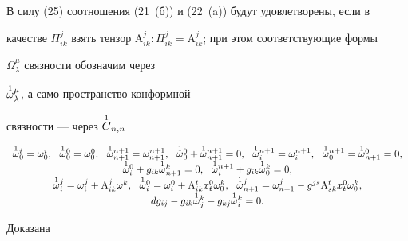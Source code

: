 В силу (25) соотношения (21~(б)) и (22~(a)) будут удовлетворены, если в 


качестве $\Pi^j_{i k}$ взять тензор $\mathrm A^j_{i k}:\Pi^j_{i 


k}=\mathrm A^j_{i k}$; при этом соответствующие формы 


$\Omega^\mu_\lambda$ связности обозначим через 


$\overset{1}{\omega}{}{^\mu_\lambda}$, а само пространство конформной 


связности --- через $\overset{1}{C}{}{}_{n,n}$


\begin{equation} 


\begin{array}{c} 


\up{1}{\omega}{}^i_0=\omega^i_0,\ \ \up{1}{\omega}{}^0_0= 


\omega^0_0,\ \ \up{1}{\omega}{}^{n+1}_{n+1}=\omega^{n+1}_{n+1}, \ \ 


\up{1}{\omega}{}^0_0+\up{1}{\omega}{}^{n+1}_{n+1}=0, \ \ 


\up{1}{\omega}{}^{n+1}_i=\omega^{n+1}_i,\ \ 


\up{1}{\omega}{}^{n+1}_0=\up{1}{\omega}{}^0_{n+1}=0, \\ 


% 


\up{1}{\omega}{}^0_i+g_{i k}\up{1}{\omega}{}^k_{n+1}=0, 


\ \ \up{1}{\omega}{}^{n+1}_i+g_{i k}\up{1}{\omega}{}^k_0=0, \\ 


% 


\up{1}{\omega}{}^j_i=\omega^j_i+\mathrm A^j_{i k}\omega^k, 


\ \ \up{1}{\omega}{}^0_i=\omega^0_i+\mathrm A^t_{i k} 


x^0_t\omega^k_0,\ \ \up{1}{\omega}{}^j_{n+1}=\omega^j_{n+1} 


-g^{j s}\mathrm A^t_{s k}x^0_t\omega^k_0, \\ 


%


d g_{i j}-g_{i k}\up{1}{\omega}{}^k_j-g_{k j} 


\up{1}{\omega}{}^k_i=0. 


\end{array} 


\end{equation} 


 


Доказана 


